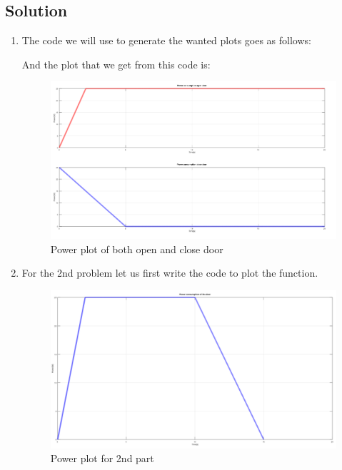 \documentclass[a4paper, 10pt]{article}
\begin{document}
		\subsection{Solution}
			\begin{enumerate}
				\item 
					The code we will use to generate the wanted plots goes as follows:
					
					
					\pagebreak
					\noindent And the plot that we get from this code is:
					\begin{figure}[h]
						\centering
						\includegraphics[scale = 0.35]{powerPlot}
						\caption{Power plot of both open and close door}
						\label{fig:Power Plot}
					\end{figure}
				
				\item 
					For the 2nd problem let us first write the code to plot the function.
					
					\pagebreak
					
					\begin{figure}[h]
						\centering
						\includegraphics[scale = 0.35]{powerConsumptionProblem}
						\caption{Power plot for 2nd part}
						\label{fig:Power Plot of the problem}
					\end{figure}
					

\end{enumerate}
\end{document}

